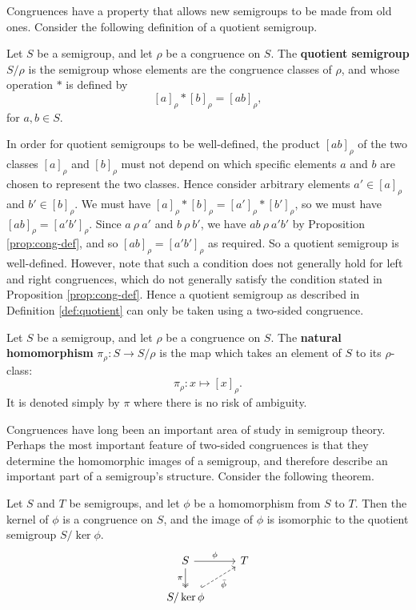 Congruences have a property that allows new semigroups to be made from old
ones.  Consider the following definition of a quotient semigroup.

\begin{definition}
  \label{def:quotient}
  Let $S$ be a semigroup, and let $\rho$ be a congruence on $S$.  The
  \textbf{quotient semigroup} $S / \rho$ is the semigroup whose elements are the
  congruence classes of $\rho$, and whose operation $*$ is defined by
  $$[a]_\rho * [b]_\rho = [ab]_\rho,$$
  for $a, b \in S$.
\end{definition}


In order for quotient semigroups to be well-defined, the product $[ab]_\rho$ of
the two classes $[a]_\rho$ and $[b]_\rho$ must not depend on which specific
elements $a$ and $b$ are chosen to represent the two classes.  Hence consider
arbitrary elements $a' \in [a]_\rho$ and $b' \in [b]_\rho$.  We must have
$[a]_\rho * [b]_\rho = [a']_\rho * [b']_\rho$, so we must have
$[ab]_\rho = [a'b']_\rho$.  Since $a ~\rho~ a'$ and $b ~\rho~ b'$, we have
$ab ~\rho~ a'b'$ by Proposition \ref{prop:cong-def}, and so
$[ab]_\rho = [a'b']_\rho$ as required.  So a quotient semigroup is well-defined.
However, note that such a condition does not generally hold for left and right
congruences, which do not generally satisfy the condition stated in Proposition
\ref{prop:cong-def}.  Hence a quotient semigroup as described in Definition
\ref{def:quotient} can only be taken using a two-sided congruence.

\begin{definition}
  \label{def:natural-homomorphism}
  Let $S$ be a semigroup, and let $\rho$ be a congruence on $S$.  The
  \textbf{natural homomorphism} $\pi_\rho: S \to S / \rho$ is the map which
  takes an element of $S$ to its $\rho$-class:
  $$\pi_\rho: x \mapsto [x]_\rho.$$
  It is denoted simply by $\pi$ where there is no risk of ambiguity.
\end{definition}

Congruences have long been an important area of study in semigroup theory.
Perhaps the most important feature of two-sided congruences is that they
determine the homomorphic images of a semigroup, and therefore describe an
important part of a semigroup's structure.  Consider the following theorem.

\begin{theorem}
  \label{thm:first-isomorphism}
  Let $S$ and $T$ be semigroups, and let $\phi$ be a homomorphism from $S$ to
  $T$.  Then the kernel of $\phi$ is a congruence on $S$, and the image of
  $\phi$ is isomorphic to the quotient semigroup $S / \ker{\phi}$.
  $$
  \begin{tikzcd}
    S \ar[d, two heads, "\pi"'] \ar[r, "\phi"] & T \\
    S / \ker{\phi} \ar[ur, dashed, hook, "\bar\phi"']
  \end{tikzcd}
  $$
\end{theorem}

